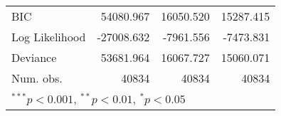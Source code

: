 \begin{tabular}{l D{)}{)}{13)3} D{)}{)}{13)3} D{)}{)}{13)3} }
BIC                                & 54080.967              & 16050.520               & 15287.415               \\
Log Likelihood                     & -27008.632             & -7961.556               & -7473.831               \\
Deviance                           & 53681.964              & 16067.727               & 15060.071               \\
Num. obs.                          & 40834                  & 40834                   & 40834                   \\
\bottomrule
{}
\end{tabular}
